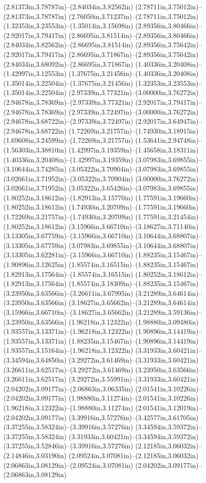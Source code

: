 (2.81373in,3.78787in)--(2.84034in,3.82562in) (2.78711in,3.75012in)--(2.81373in,3.78787in) (2.76050in,3.71237in)--(2.78711in,3.75012in) (1.32353in,3.23553in)--(1.35014in,3.15698in) (2.89356in,3.80466in)--(2.92017in,3.79417in) (2.86695in,3.81514in)--(2.89356in,3.80466in) (2.84034in,3.82562in)--(2.86695in,3.81514in) (2.89356in,3.75642in)--(2.92017in,3.79417in) (2.86695in,3.71867in)--(2.89356in,3.75642in) (2.84034in,3.68092in)--(2.86695in,3.71867in) (1.40336in,3.20408in)--(1.42997in,3.12553in) (1.37675in,3.21456in)--(1.40336in,3.20408in) (1.35014in,3.22504in)--(1.37675in,3.21456in) (1.32353in,3.23553in)--(1.35014in,3.22504in) (2.97339in,3.77321in)--(3.00000in,3.76272in) (2.94678in,3.78369in)--(2.97339in,3.77321in) (2.92017in,3.79417in)--(2.94678in,3.78369in) (2.97339in,3.72497in)--(3.00000in,3.76272in) (2.94678in,3.68722in)--(2.97339in,3.72497in) (2.92017in,3.64947in)--(2.94678in,3.68722in) (1.72269in,3.21757in)--(1.74930in,3.18915in) (1.69608in,3.24599in)--(1.72269in,3.21757in) (1.53641in,2.94748in)--(1.56303in,3.38810in) (1.42997in,3.19359in)--(1.45658in,3.18311in) (1.40336in,3.20408in)--(1.42997in,3.19359in) (3.07983in,3.69855in)--(3.10644in,3.74285in) (3.05322in,3.70904in)--(3.07983in,3.69855in) (3.02661in,3.71952in)--(3.05322in,3.70904in) (3.00000in,3.76272in)--(3.02661in,3.71952in) (3.05322in,3.65426in)--(3.07983in,3.69855in) (1.80252in,3.18612in)--(1.82913in,3.15770in) (1.77591in,3.19660in)--(1.80252in,3.18612in) (1.74930in,3.20709in)--(1.77591in,3.19660in) (1.72269in,3.21757in)--(1.74930in,3.20709in) (1.77591in,3.21454in)--(1.80252in,3.18612in) (3.15966in,3.66710in)--(3.18627in,3.71140in) (3.13305in,3.67759in)--(3.15966in,3.66710in) (3.10644in,3.68807in)--(3.13305in,3.67759in) (3.07983in,3.69855in)--(3.10644in,3.68807in) (3.13305in,3.62281in)--(3.15966in,3.66710in) (1.88235in,3.15467in)--(1.90896in,3.12625in) (1.85574in,3.16515in)--(1.88235in,3.15467in) (1.82913in,3.17564in)--(1.85574in,3.16515in) (1.80252in,3.18612in)--(1.82913in,3.17564in) (1.85574in,3.18309in)--(1.88235in,3.15467in) (3.23950in,3.63566in)--(3.26611in,3.67995in) (3.21289in,3.64614in)--(3.23950in,3.63566in) (3.18627in,3.65662in)--(3.21289in,3.64614in) (3.15966in,3.66710in)--(3.18627in,3.65662in) (3.21289in,3.59136in)--(3.23950in,3.63566in) (1.96218in,3.12322in)--(1.98880in,3.09480in) (1.93557in,3.13371in)--(1.96218in,3.12322in) (1.90896in,3.14419in)--(1.93557in,3.13371in) (1.88235in,3.15467in)--(1.90896in,3.14419in) (1.93557in,3.15164in)--(1.96218in,3.12322in) (3.31933in,3.60421in)--(3.34594in,3.64850in) (3.29272in,3.61469in)--(3.31933in,3.60421in) (3.26611in,3.62517in)--(3.29272in,3.61469in) (3.23950in,3.63566in)--(3.26611in,3.62517in) (3.29272in,3.55991in)--(3.31933in,3.60421in) (2.04202in,3.09177in)--(2.06863in,3.06335in) (2.01541in,3.10226in)--(2.04202in,3.09177in) (1.98880in,3.11274in)--(2.01541in,3.10226in) (1.96218in,3.12322in)--(1.98880in,3.11274in) (2.01541in,3.12019in)--(2.04202in,3.09177in) (3.39916in,3.57276in)--(3.42577in,3.61705in) (3.37255in,3.58324in)--(3.39916in,3.57276in) (3.34594in,3.59372in)--(3.37255in,3.58324in) (3.31933in,3.60421in)--(3.34594in,3.59372in) (3.37255in,3.52846in)--(3.39916in,3.57276in) (2.12185in,3.06032in)--(2.14846in,3.03190in) (2.09524in,3.07081in)--(2.12185in,3.06032in) (2.06863in,3.08129in)--(2.09524in,3.07081in) (2.04202in,3.09177in)--(2.06863in,3.08129in) 